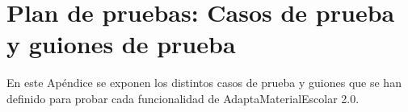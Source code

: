 \chapter{Plan de pruebas: Casos de prueba y guiones de prueba}\label{ape:pruebas}

En este Apéndice se exponen los distintos casos de prueba y guiones que se han definido para probar cada funcionalidad de AdaptaMaterialEscolar 2.0.